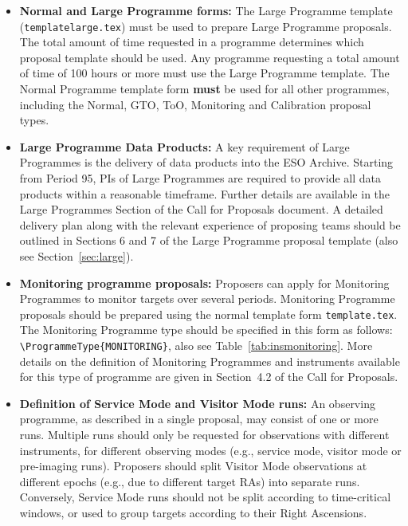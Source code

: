 \documentclass{article}
\begin{document}
\begin{itemize}

\item{\bf Normal and Large Programme forms:}
The Large Programme template ({\tt templatelarge.tex}) must be used to
prepare Large Programme proposals. The total amount of time requested in a programme determines which proposal template should be used.
Any programme requesting a total amount of time of 100 hours or more
must use the Large Programme template.
The Normal Programme template form {\bf must} be used for all other programmes,
including the Normal, GTO, ToO, Monitoring and Calibration proposal types.


\item{\bf Large Programme Data Products: }
A key requirement of Large Programmes is the delivery of data products into the ESO Archive. Starting from Period 95, PIs of Large Programmes are required to provide all data products within a reasonable timeframe. Further details are available in the Large Programmes Section of the Call for Proposals document.
A detailed delivery plan along with the relevant experience of proposing teams
should be outlined in Sections 6 and 7 of the Large Programme proposal template
(also see Section~\ref{sec:large}).

\item{\bf Monitoring programme proposals:}  
Proposers can apply for Monitoring Programmes to monitor targets over several periods.  
Monitoring Programme proposals should be prepared using the normal template form \verb|template.tex|. 
The Monitoring Programme type should be specified in this form as follows: \verb|\ProgrammeType{MONITORING}|, also see Table~\ref{tab:insmonitoring}.
More details on the definition of Monitoring Programmes and instruments available for this type of programme are given in Section~4.2 of the Call for Proposals.

\item{\bf Definition of Service Mode and Visitor Mode runs: }
An observing programme, as described in a single proposal, may consist of one or more runs.
Multiple runs should only be requested for observations with different instruments, for different
observing modes (e.g., service mode, visitor mode or pre-imaging runs).
Proposers should split Visitor Mode observations at different epochs (e.g., due to different target RAs) into
separate runs. Conversely, Service Mode runs should not be split
according to time-critical windows, or used to group targets according to their Right Ascensions.



\end{itemize}
\end{document}
